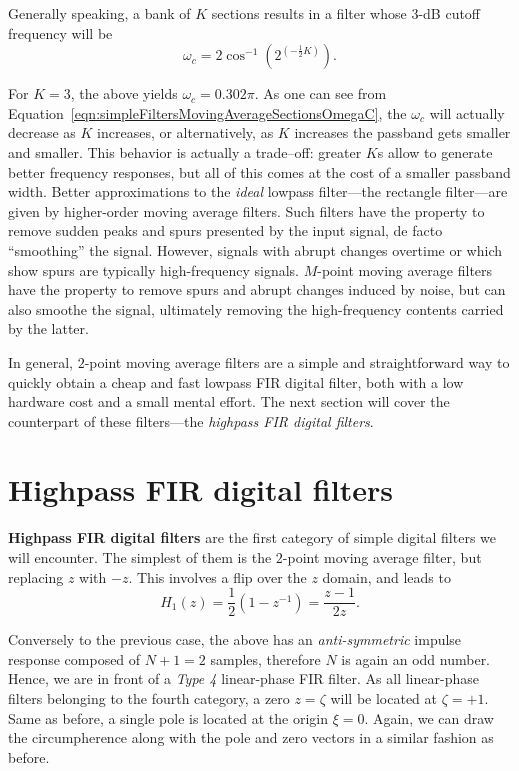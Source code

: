 \documentclass[\documentfontsize, twocolumn]{\classname}
\begin{document}
Generally speaking, a bank of $K$ sections results in a filter whose $3$-dB cutoff frequency will be
\begin{equation}\label{eqn:simpleFiltersMovingAverageSectionsOmegaC}
    \omega_c = 2\cos^{-1}{\left(2^{(-\frac 1 2 K)}\right)}.
\end{equation}

For $K = 3$, the above yields $\omega_c = 0.302\pi$.
As one can see from Equation~\ref{eqn:simpleFiltersMovingAverageSectionsOmegaC}, the $\omega_c$ will actually decrease as $K$ increases, or alternatively, as $K$ increases the passband gets smaller and smaller.
This behavior is actually a trade--off: greater $K$s allow to generate better frequency responses, but all of this comes at the cost of a smaller passband width.
Better approximations to the \emph{ideal} lowpass filter---the rectangle filter---are given by higher-order moving average filters.
Such filters have the property to remove sudden peaks and spurs presented by the input signal, de facto ``smoothing'' the signal.
However, signals with abrupt changes overtime or which show spurs are typically high-frequency signals.
$M$-point moving average filters have the property to remove spurs and abrupt changes induced by noise, but can also smoothe the signal, ultimately removing the high-frequency contents carried by the latter.

In general, $2$-point moving average filters are a simple and straightforward way to quickly obtain a cheap and fast lowpass FIR digital filter, both with a low hardware cost and a small mental effort. The next section will cover the counterpart of these filters---the \emph{highpass FIR digital filters}.

\section{Highpass FIR digital filters}
\textbf{Highpass FIR digital filters} are the first category of simple digital filters we will encounter. The simplest of them is the $2$-point moving average filter, but replacing $z$ with $-z$. This involves a flip over the $z$ domain, and leads to
\begin{equation}\label{eqn:twoPointMovingAverageFilterFIRHighpass}
    H_1(z) = \frac 1 2 \left(1 - z^{-1}\right) = \frac {z-1} {2z}.
\end{equation}

Conversely to the previous case, the above has an \emph{anti-symmetric} impulse response composed of $N+1 = 2$ samples, therefore $N$ is again an odd number.
Hence, we are in front of a \emph{Type 4} linear-phase FIR filter.
As all linear-phase filters belonging to the fourth category, a zero $z = \zeta$ will be located at $\zeta = +1$.
Same as before, a single pole is located at the origin $\xi = 0$.
Again, we can draw the circumpherence along with the pole and zero vectors in a similar fashion as before.
\end{document}
